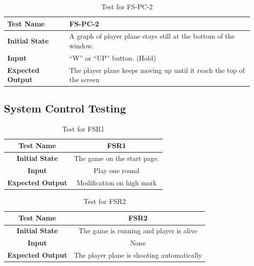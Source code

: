 \documentclass[12,english]{article}
\begin{document}
				\begin{table}[!htbp]
			
			\begin{tabularx}{\textwidth}{|l|X|}
				
				\hline
				
				\textbf{Test Name} & FS-PC-2
				\\ 
				\hline
				\textbf{Initial State} & A graph of player plane stays still at the bottom of the window. \\ 
				\hline
				\textbf{Input} & “W” or “UP” button. (Hold)  \\ 
				\hline 
				\textbf{Expected Output} & The player plane keeps moving up until it reach the top of the screen \\ 
				\hline
				
			\end{tabularx}
			\caption{Test for FS-PC-2}
			\label{Table}
		\end{table}
	
		
\newpage
\subsection{System Control Testing}
\begin{table}[!htbp]
\begin{tabular}{|c|c|}
\hline
\textbf{Test Name} & FSR1\\
\hline
\textbf{Initial State} &The game on the start page.\\
\hline
\textbf{Input} &Play one round\\
\hline
\textbf{Expected Output}&Modification on high mark\\
\hline
\end{tabular}
\caption{Test for FSR1}
\label{Table}
\end{table}

\begin{table}[!htbp]
\begin{tabular}{|c|c|}
\hline
\textbf{Test Name} &FSR2\\
\hline
\textbf{Initial State} &The game is running and player is alive\\
\hline
\textbf{Input} &None\\
\hline
\textbf{Expected Output}&The player plane is shooting automatically\\
\hline
\end{tabular}
\caption{Test for FSR2}
\label{Table}
\end{table}
\end{document}
